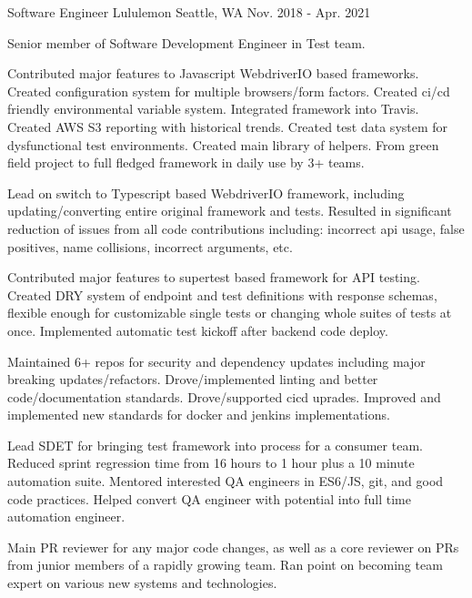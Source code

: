 \begin{cventries}
\cventry
  {Software Engineer} %
  {Lululemon} %
  {Seattle, WA} %
  {Nov. 2018 - Apr. 2021} %
  {
    \begin{cvitems} %
      \item[] {Senior member of Software Development Engineer in Test team.}
      \item[]
      \item {Contributed major features to Javascript WebdriverIO based frameworks. Created configuration system for multiple browsers/form factors. Created ci/cd friendly environmental variable system. Integrated framework into Travis. Created AWS S3 reporting with historical trends. Created test data system for dysfunctional test environments. Created main library of helpers. From green field project to full fledged framework in daily use by 3+ teams.}
      \item {Lead on switch to Typescript based WebdriverIO framework, including updating/converting entire original framework and tests. Resulted in significant reduction of issues from all code contributions including: incorrect api usage, false positives, name collisions, incorrect arguments, etc.}
      \item {Contributed major features to supertest based framework for API testing. Created DRY system of endpoint and test definitions with response schemas, flexible enough for customizable single tests or changing whole suites of tests at once. Implemented automatic test kickoff after backend code deploy.}
      \item {Maintained 6+ repos for security and dependency updates including major breaking updates/refactors. Drove/implemented linting and better code/documentation standards. Drove/supported cicd uprades. Improved and implemented new standards for docker and jenkins implementations.}
      \item {Lead SDET for bringing test framework into process for a consumer team. Reduced sprint regression time from 16 hours to 1 hour plus a 10 minute automation suite. Mentored interested QA engineers in ES6/JS, git, and good code practices. Helped convert QA engineer with potential into full time automation engineer.}
      \item {Main PR reviewer for any major code changes, as well as a core reviewer on PRs from junior members of a rapidly growing team. Ran point on becoming team expert on various new systems and technologies.}
    \end{cvitems}
  }


\end{cventries}
